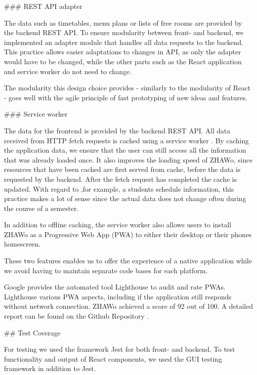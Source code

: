\begin{markdown}
\bigskip

### REST API adapter

The data such as timetables, menu plans or lists of free rooms are provided by the backend REST API. To ensure modularity between front- and backend, we implemented an adapter module that handles all data requests to the backend. This practice allows easier adaptations to changes in API, as only the adapter would have to be changed, while the other parts such as the React application and service worker do not need to change.

The modularity this design choice provides - similarly to the modularity of React - goes well with the agile principle of fast prototyping of new ideas and features.

### Service worker

The data for the frontend is provided by the backend REST API. All data received from HTTP fetch requests is cached using a service worker \cite{ServiceWorker}. By caching the application data, we ensure that the user can still access all the information that was already loaded once. It also improves the loading speed of ZHAWo, since resources that have been cached are first served from cache, before the data is requested by the backend. After the fetch request has completed the cache is updated. With regard to ,for example, a students schedule information, this practice makes a lot of sense since the actual data does not change often during the course of a semester.

In addition to offline caching, the service worker also allows users to install ZHAWo as a Progressive Web App (PWA) \cite{WhatIsPWA} to either their desktop or their phones homescreen.

These two features enables us to offer the experience of a native application while we avoid having to maintain separate code bases for each platform.

Google provides the automated tool Lighthouse \cite{Lighthouse} to audit and rate PWAs. Lighthouse various PWA aspects, including if the application still responds without network connection. ZHAWo achieved a score of 92 out of 100. A detailed report can be found on the Github Repository \cite{OurGithub}.

## Test Coverage

For testing we used the framework Jest \cite{Jest} for both front- and backend. To test functionality and output of React components, we used the GUI testing framework \cite{Enzyme} in addition to Jest.


\end{markdown}
